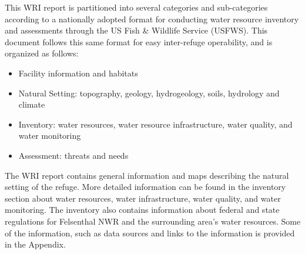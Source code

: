 \documentclass[]{book}
\providecommand{\tightlist}{%
  \setlength{\itemsep}{0pt}\setlength{\parskip}{0pt}}
\begin{document}
This WRI report is partitioned into several categories and
sub-categories according to a nationally adopted format for conducting
water resource inventory and assessments through the US Fish \& Wildlife
Service (USFWS). This document follows this same format for easy
inter-refuge operability, and is organized as follows:

\begin{itemize}
\tightlist
\item
  Facility information and habitats
\item
  Natural Setting: topography, geology, hydrogeology, soils, hydrology
  and climate
\item
  Inventory: water resources, water resource infrastructure, water
  quality, and water monitoring
\item
  Assessment: threats and needs
\end{itemize}

The WRI report contains general information and maps describing the
natural setting of the refuge. More detailed information can be found in
the inventory section about water resources, water infrastructure, water
quality, and water monitoring. The inventory also contains information
about federal and state regulations for Felsenthal NWR and the
surrounding area's water resources. Some of the information, such as
data sources and links to the information is provided in the Appendix.


\end{document}
